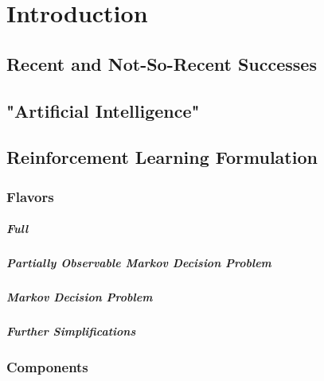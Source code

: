 \chapter{Introduction} %

	\section{Recent and Not-So-Recent Successes} %

	\section{"Artificial Intelligence"} %

	\section{Reinforcement Learning Formulation} %

		\subsection{Flavors} %

			\paragraph{Full} %

			\paragraph{Partially Observable Markov Decision Problem} %

			\paragraph{Markov Decision Problem} %

			\paragraph{Further Simplifications} %

		\subsection{Components} %

